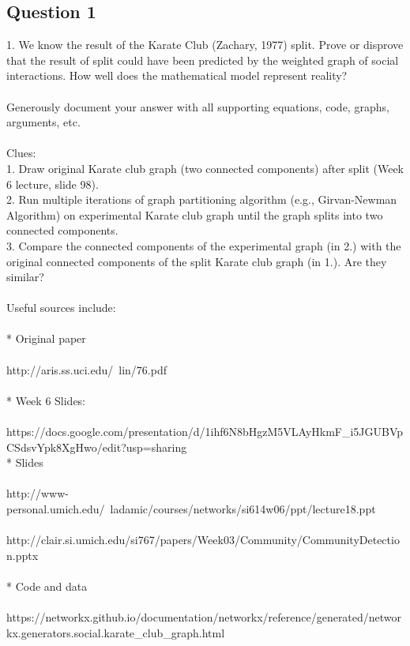 \documentclass[10pt,letterpaper]{article}
\begin{document}
\subsection{Question 1}
1.  We know the result of the Karate Club (Zachary, 1977) split.
Prove or disprove that the result of split could have been predicted
by the weighted graph of social interactions.  How well does the
mathematical model represent reality?\\
\\
Generously document your answer with all supporting equations, code,
graphs, arguments, etc.\\
\\
Clues: \\
1. Draw original Karate club graph (two connected components) after split (Week 6 lecture, slide 98).\\
2. Run multiple iterations of graph partitioning algorithm (e.g., Girvan-Newman Algorithm) on experimental Karate club graph until the graph splits into two connected components.\\
3. Compare the connected components of the experimental graph (in 2.) with the original connected components of the split Karate club graph (in 1.). Are they similar?\\
\\
Useful sources include:\\
\\
* Original paper\\
\\
http://aris.ss.uci.edu/~lin/76.pdf\\
\\
* Week 6 Slides:\\
\\
https://docs.google.com/presentation/d/1ihf6N8bHgzM5VLAyHkmF\_i5JGUBVpCSdsvYpk8XgHwo/edit?usp=sharing
\\
* Slides\\
\\
http://www-personal.umich.edu/~ladamic/courses/networks/si614w06/ppt/lecture18.ppt\\
\\
http://clair.si.umich.edu/si767/papers/Week03/Community/CommunityDetection.pptx\\
\\
* Code and data\\
\\
https://networkx.github.io/documentation/networkx/reference/generated/networkx.generators.social.karate\_club\_graph.html\\
\end{document}
